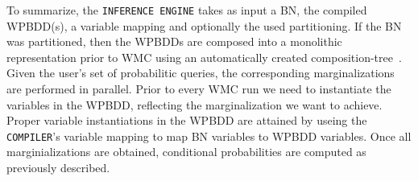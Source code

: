 To summarize, the \texttt{INFERENCE ENGINE} takes as input a BN, the compiled WPBDD(s), a variable mapping and optionally the used partitioning. If the BN was partitioned, then the WPBDDs are composed into a monolithic representation prior to WMC using an automatically created composition-tree~\cite{dal2021compositional}. Given the user's set of probabilitic queries, the corresponding marginalizations are performed in parallel. Prior to every WMC run we need to instantiate the variables in the WPBDD, reflecting the marginalization we want to achieve. Proper variable instantiations in the WPBDD are attained by useing the \texttt{COMPILER}'s variable mapping to map BN variables to WPBDD variables. Once all marginializations are obtained, conditional probabilities are computed as previously described.
